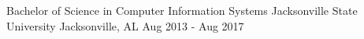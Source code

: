 
\begin{cventries}
  \cventry
    {Bachelor of Science in Computer Information Systems} %
    {Jacksonville State University} %
    {Jacksonville, AL} %
    {Aug 2013 - Aug 2017} %
\end{cventries}
